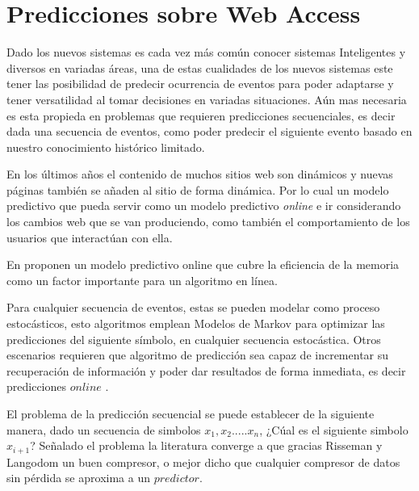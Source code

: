 \chapter[Predicciones sobre Web Access]{Predicciones sobre Web Access} \label{ch:tema}





Dado los nuevos sistemas es cada vez más común conocer sistemas Inteligentes y diversos en variadas áreas, una de estas cualidades de los nuevos sistemas este tener las posibilidad de predecir ocurrencia de eventos para poder adaptarse y tener versatilidad al tomar decisiones en variadas situaciones. Aún mas necesaria es esta propieda en problemas que requieren predicciones secuenciales, es decir dada una secuencia de eventos, como poder predecir el siguiente evento basado en nuestro conocimiento histórico limitado.

En los últimos años el contenido de muchos sitios web son dinámicos y nuevas páginas también se añaden al sitio de forma dinámica. Por lo cual un modelo predictivo que pueda servir como un modelo predictivo \emph{online} e ir considerando los cambios web que se van produciendo, como también el comportamiento de los usuarios que interactúan con ella.

En \cite{Moghaddam2009} proponen un modelo predictivo online que cubre la eficiencia de la memoria como un factor importante para un algoritmo en línea. 



Para cualquier secuencia de eventos, estas se pueden modelar como proceso estocásticos, esto algoritmos emplean Modelos de Markov para optimizar las predicciones del siguiente símbolo, en cualquier secuencia estocástica. Otros escenarios requieren que algoritmo de predicción sea capaz de incrementar su recuperación de información  y poder dar resultados de forma inmediata, es decir predicciones $online$ .

El problema de la predicción secuencial se puede establecer de la siguiente manera, dado un secuencia de simbolos $x_{1}, x_{2}.....x_{n}$, ¿Cúal es el siguiente simbolo $x_{i+1}$? Señalado el problema la literatura converge a que gracias Risseman y Langodom
un buen compresor, o mejor dicho que cualquier compresor de datos sin pérdida se aproxima a un $predictor$.

